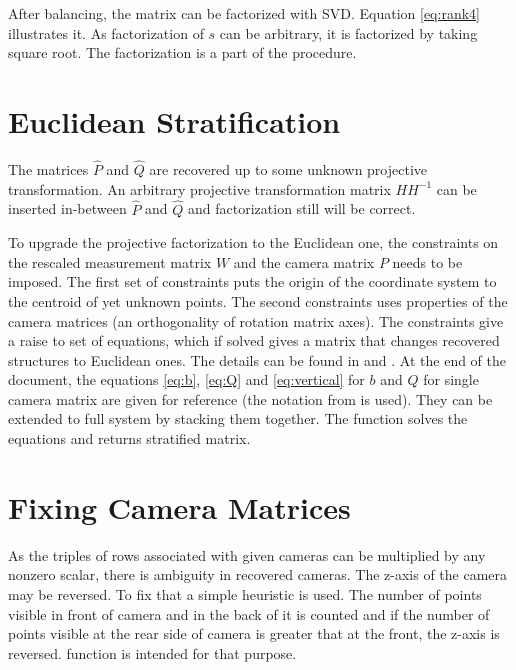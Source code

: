 \documentclass[12pt]{article}
\begin{document}
After balancing, the matrix can be factorized with SVD. Equation \ref{eq:rank4}
illustrates it. As factorization of $s$ can be arbitrary, it is factorized by
taking square root. The factorization is a part of the
 procedure.



\section{Euclidean Stratification}

The matrices $\hat{P}$ and $\hat{Q}$ are recovered up to some unknown projective
transformation. An arbitrary projective transformation matrix $HH^{-1}$ can be inserted
in-between $\hat{P}$ and $\hat{Q}$ and factorization still will be correct.


To upgrade the projective factorization to the Euclidean one, the constraints on
the rescaled measurement matrix $W$ and the camera matrix $P$ needs to be
imposed. The first set of constraints puts the origin of the coordinate system
to the centroid of yet unknown points. The  second constraints uses properties
of the camera matrices (an orthogonality of rotation matrix   axes). The
constraints give a raise to set of equations, which if solved gives a matrix
that   changes recovered structures to Euclidean ones. The details can be found
in \cite{svoboda05}   and \cite{han00}. At the end of the document, the
equations \ref{eq:b}, \ref{eq:Q} and   \ref{eq:vertical} for $b$ and $Q$ for
single camera matrix are given for reference (the   notation from
\cite{svoboda05} is used). They can be extended to full system by stacking them
together. The function  solves the equations
and returns   stratified matrix.

\newpage

\section{Fixing Camera Matrices}

As the triples of rows associated with given cameras can be multiplied by any
nonzero scalar, there is ambiguity in recovered cameras. The z-axis of the
camera may be reversed. To fix that a simple heuristic is used. The number of
points visible in front of camera and in the back of it is counted and if the
number of points visible at the rear side of camera is greater that at  the
front, the z-axis is reversed.  function is
intended for  that purpose.
\end{document}

